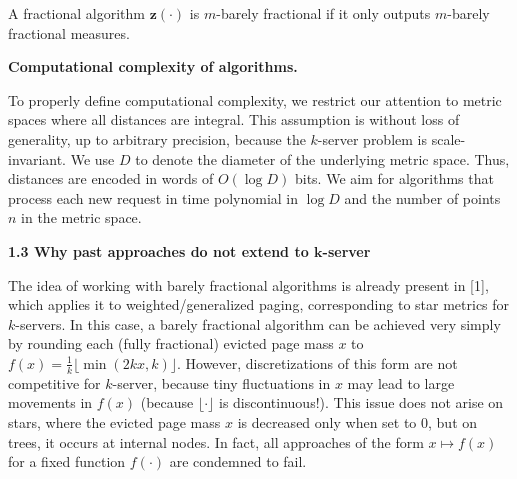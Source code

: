 A fractional algorithm ${\mathbf{z}}(\cdot)$ is $m$-barely fractional if it only outputs $m$-barely fractional measures.\par





\par\medskip\noindent\textbf{Computational complexity of algorithms.}\par




To properly define computational complexity, we restrict our attention to metric spaces where all distances are integral. This assumption is without loss of generality, up to arbitrary precision, because the $k$-server problem is scale-invariant. We use $D$ to denote the diameter of the underlying metric space. Thus, distances are encoded in words of $O(\log D)$ bits. We aim for algorithms that process each new request in time polynomial in $\log D$ and the number of points $n$ in the metric space.\par






\par\medskip\noindent\textbf{
1.3 Why past approaches do not extend to $\boldsymbol{k}$-server}\par




The idea of working with barely fractional algorithms is already present in [1], which applies it to weighted/generalized paging, corresponding to star metrics for $k$-servers. In this case, a barely fractional algorithm can be achieved very simply by rounding each (fully fractional) evicted page mass $x$ to $f(x)=\frac{1}{k}\lfloor\min(2kx,k)\rfloor$. However, discretizations of this form are not competitive for $k$-server, because tiny fluctuations in $x$ may lead to large movements in $f(x)$ (because ${\lfloor\cdot\rfloor}$ is discontinuous!). This issue does not arise on stars, where the evicted page mass $x$ is decreased only when set to $0$, but on trees, it occurs at internal nodes. In fact, all approaches of the form $x\mapsto f(x)$ for a fixed function $f(\cdot)$ are condemned to fail.\par




